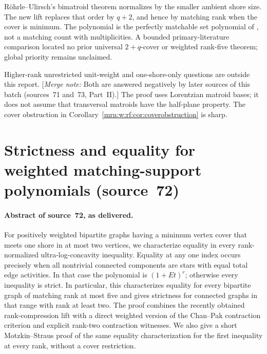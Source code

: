 \documentclass[11pt,a4paper]{article}
\theoremstyle{remark}\newtheorem{remark}[theorem]{Remark}
\newcommand{\mnote}[1]{[\textit{Merge note:} #1]}
\begin{document}
R\"ohrle--Ulirsch's bimatroid theorem \cite{b:RU} normalizes by the smaller ambient shore size. The new lift replaces that order by $q+2$, and hence by matching rank when the cover is minimum. The polynomial is the perfectly matchable set polynomial of \cite{b:DK}, not a matching count with multiplicities. A bounded primary-literature comparison located no prior universal $2+q$-cover or weighted rank-five theorem; global priority remains unclaimed.

Higher-rank unrestricted unit-weight and one-shore-only questions are outside this report.
\mnote{Both are answered negatively by later sources of this batch (sources~71 and~73, Part~II).} The proof uses Lorentzian matroid bases; it does not assume that transversal matroids have the half-plane property. The cover obstruction in Corollary~\ref{mrn:w:rf:cor:coverobstruction} is sharp.



\section{Strictness and equality for weighted matching-support polynomials (source~72)}\label{mrn:src:72}
\paragraph{Abstract of source~72, as delivered.} For positively weighted bipartite graphs having a minimum vertex cover that meets one shore in at most two vertices, we characterize equality in every rank-normalized ultra-log-concavity inequality. Equality at any one index occurs precisely when all nontrivial connected components are stars with equal total edge activities. In that case the polynomial is $(1+Et)^r$; otherwise every inequality is strict. In particular, this characterizes equality for every bipartite graph of matching rank at most five and gives strictness for connected graphs in that range with rank at least two. The proof combines the recently obtained rank-compression lift with a direct weighted version of the Chan--Pak contraction criterion and explicit rank-two contraction witnesses. We also give a short Motzkin--Straus proof of the same equality characterization for the first inequality at every rank, without a cover restriction.
\end{document}
